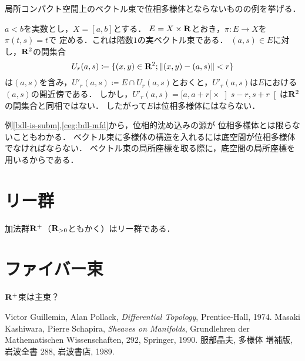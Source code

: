局所コンパクト空間上のベクトル束で位相多様体とならないものの例を挙げる．

\begin{EG}\label{ceg:bdl-mfd}
  \(a<b\)を実数とし，\(X=[a,b]\)とする．
  \(E=X\times\mathbf{R}\)とおき，\(\pi\colon E\to X\)を\(\pi(t,s)=t\)で
  定める．これは階数\(1\)の実ベクトル束である．
  \((a,s)\in E\)に対し，\(\mathbf{R}^2\)の開集合\[
    U_{r}(a,s)\coloneqq\{(x,y)\in\mathbf{R}^2;\lVert{(x,y)-(a,s)}\rVert<r\}
  \]は\((a,s)\)を含み，\(
    U'_{r}(a,s)\coloneqq E\cap U_{r}(a,s)
  \)とおくと，\(U'_{r}(a,s)\)は\(E\)における\((a,s)\)の開近傍である．
  しかし，\(U'_{r}(a,s)={[a,a+r[}\times {\left]s-r,s+r\right[}\)は\(\mathbf{R}^2\)の開集合と同相ではない．
  したがって\(E\)は位相多様体にはならない．
\end{EG}

例\ref{bdl-is-subm},\ref{ceg:bdl-mfd}から，位相的沈め込みの源が
位相多様体とは限らないこともわかる．
ベクトル束に多様体の構造を入れるには底空間が位相多様体でなければならない．
ベクトル束の局所座標を取る際に，底空間の局所座標を用いるからである．

\section{リー群}
\begin{EG}
  加法群\(\mathbf{R}^{+}\)（\(\mathbf{R}_{>0}\)ともかく）はリー群である．
\end{EG}

\section{ファイバー束}
\(\mathbf{R}^+\)束は主束？


\begin{thebibliography}{20} 
   Victor Guillemin, Alan Pollack, 
      \textit{Differential Topology}, 
      Prentice-Hall, 1974.
   Masaki Kashiwara, Pierre Schapira, 
      \textit{Sheaves on Manifolds}, 
      Grundlehren der Mathematischen Wissenschaften, 292, Springer, 1990.
   服部晶夫, 多様体 増補版, 岩波全書 288, 岩波書店, 1989.
\end{thebibliography}






